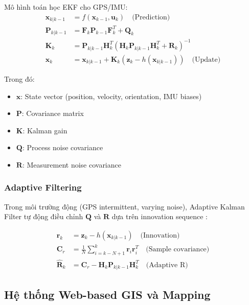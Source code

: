 Mô hình toán học EKF cho GPS/IMU:
\begin{equation}
\begin{aligned}
\mathbf{x}_{k|k-1} &= f(\mathbf{x}_{k-1}, \mathbf{u}_k) \quad \text{(Prediction)} \\
\mathbf{P}_{k|k-1} &= \mathbf{F}_k \mathbf{P}_{k-1} \mathbf{F}_k^T + \mathbf{Q}_k \\
\mathbf{K}_k &= \mathbf{P}_{k|k-1} \mathbf{H}_k^T (\mathbf{H}_k \mathbf{P}_{k|k-1} \mathbf{H}_k^T + \mathbf{R}_k)^{-1} \\
\mathbf{x}_k &= \mathbf{x}_{k|k-1} + \mathbf{K}_k(\mathbf{z}_k - h(\mathbf{x}_{k|k-1})) \quad \text{(Update)}
\end{aligned}
\end{equation}

Trong đó:
\begin{itemize}
    \item $\mathbf{x}$: State vector (position, velocity, orientation, IMU biases)
    \item $\mathbf{P}$: Covariance matrix
    \item $\mathbf{K}$: Kalman gain
    \item $\mathbf{Q}$: Process noise covariance
    \item $\mathbf{R}$: Measurement noise covariance
\end{itemize}

\subsubsection{Adaptive Filtering}
Trong môi trường động (GPS intermittent, varying noise), Adaptive Kalman Filter tự động điều chỉnh $\mathbf{Q}$ và $\mathbf{R}$ dựa trên innovation sequence \cite{simon2006optimal}:

\begin{equation}
\begin{aligned}
\mathbf{r}_k &= \mathbf{z}_k - h(\mathbf{x}_{k|k-1}) \quad \text{(Innovation)} \\
\mathbf{C}_r &= \frac{1}{N}\sum_{i=k-N+1}^{k} \mathbf{r}_i \mathbf{r}_i^T \quad \text{(Sample covariance)} \\
\hat{\mathbf{R}}_k &= \mathbf{C}_r - \mathbf{H}_k \mathbf{P}_{k|k-1} \mathbf{H}_k^T \quad \text{(Adaptive R)}
\end{aligned}
\end{equation}

\subsection{Hệ thống Web-based GIS và Mapping}


